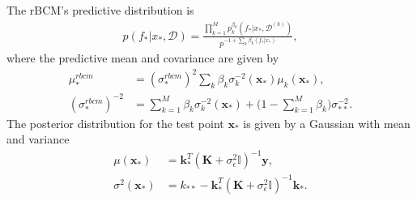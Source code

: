 \documentclass[twoside,english]{uiofysmaster}
\begin{document}
The rBCM's predictive distribution is
\begin{align}
p(f_*|x_*, \mathcal{D}) = \frac{\prod_{k=1}^Mp_k^{\beta_k} (f_*|x_*, \mathcal{D}^{(k)}) }{p^{-1+ \sum_k \beta_k (f_*|x_*)}},
\end{align}
where the predictive mean and covariance are given by
\begin{align}
\mu_*^{rbcm} &= (\sigma_*^{rbcm})^2 \sum_k \beta_k \sigma_k^{-2} (\textbf{x}_*) \mu_k (\textbf{x}_*),\\
(\sigma_*^{rbcm})^{-2} &= \sum_{k=1}^M \beta_k \sigma_k^{-2} (\textbf{x}_*) + \big(1 - \sum_{k=1}^M \beta_k \big) \sigma_{**}^{-2}.
\end{align}
The posterior distribution for the test point $\textbf{x}_*$ is given by a Gaussian with mean and variance
\begin{align}
\mu (\textbf{x}_*) &= \textbf{k}_*^T (\textbf{K} + \sigma_{\epsilon}^2 \mathbb{I})^{-1} \textbf{y},\\
\sigma^2(\textbf{x}_*) &= k_{**} - \textbf{k}_*^T(\textbf{K} + \sigma_{\epsilon}^2 \mathbb{I})^{-1} \textbf{k}_*.
\end{align}






\end{document}
